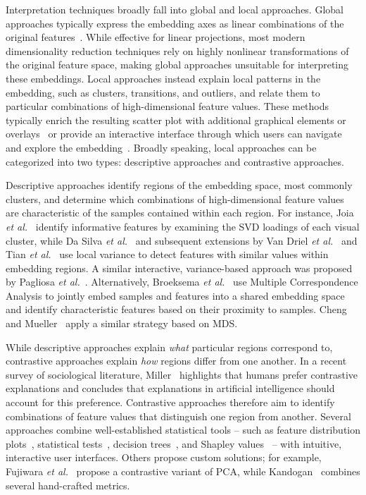 \documentclass[lettersize,journal]{IEEEtran}
\newcommand{\etal}{\textit{et al.\xspace}}
\begin{document}
Interpretation techniques broadly fall into global and local approaches.
Global approaches typically express the embedding axes as linear combinations of the original features~\cite{Broeksema2013,Coimbra2016}.
While effective for linear projections, most modern dimensionality reduction techniques rely on highly nonlinear transformations of the original feature space, making global approaches unsuitable for interpreting these embeddings.
Local approaches instead explain local patterns in the embedding, such as clusters, transitions, and outliers, and relate them to particular combinations of high-dimensional feature values.
These methods typically enrich the resulting scatter plot with additional graphical elements or overlays~\cite{Joia2015,ChengMueller2016,Tian2021} or provide an interactive interface through which users can navigate and explore the embedding~\cite{Kandogan2012,Stahnke2016,Bibal2021}. Broadly speaking, local approaches can be categorized into two types: descriptive approaches and contrastive approaches.

Descriptive approaches identify regions of the embedding space, most commonly clusters, and determine which combinations of high-dimensional feature values are characteristic of the samples contained within each region.
For instance, Joia \etal~\cite{Joia2015} identify informative features by examining the SVD loadings of each visual cluster, while Da Silva \etal~\cite{DaSilva2015} and subsequent extensions by Van Driel \etal~\cite{VanDriel2020} and Tian \etal~\cite{Tian2021} use local variance to detect features with similar values within embedding regions.
A similar interactive, variance-based approach was proposed by Pagliosa \etal~\cite{Pagliosa2016}.
Alternatively, Broeksema \etal~\cite{Broeksema2013} use Multiple Correspondence Analysis to jointly embed samples and features into a shared embedding space and identify characteristic features based on their proximity to samples. Cheng and Mueller~\cite{ChengMueller2016} apply a similar strategy based on MDS.

While descriptive approaches explain \textit{what} particular regions correspond to, contrastive approaches explain \textit{how} regions differ from one another. In a recent survey of sociological literature, Miller~\cite{Miller2019} highlights that humans prefer contrastive explanations and concludes that explanations in artificial intelligence should account for this preference.
Contrastive approaches therefore aim to identify combinations of feature values that distinguish one region from another.
Several approaches combine well-established statistical tools -- such as feature distribution plots~\cite{Stahnke2016,Eckelt2022}, statistical tests~\cite{Marcilio2021}, decision trees~\cite{Bibal2021}, and Shapley values~\cite{MarcilioEler2021} -- with intuitive, interactive user interfaces.
Others propose custom solutions; for example, Fujiwara \etal~\cite{Fujiwara2020} propose a contrastive variant of PCA, while Kandogan~\cite{Kandogan2012} combines several hand-crafted metrics.
\end{document}
